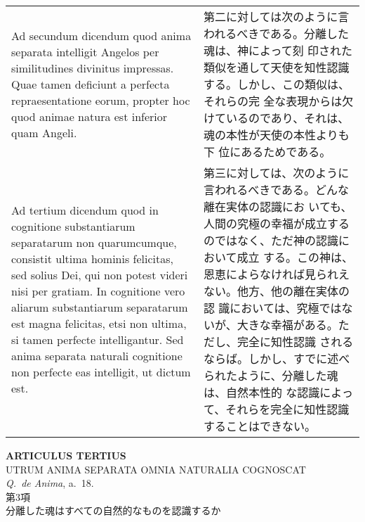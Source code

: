 \documentclass[10pt]{jsarticle} %
\begin{document}
\begin{longtable}{p{21em}p{21em}}
\\


{\sc Ad secundum dicendum} quod anima separata intelligit Angelos per
similitudines divinitus impressas. Quae tamen deficiunt a perfecta
repraesentatione eorum, propter hoc quod animae natura est inferior
quam Angeli.

&

第二に対しては次のように言われるべきである。分離した魂は、神によって刻
印された類似を通して天使を知性認識する。しかし、この類似は、それらの完
全な表現からは欠けているのであり、それは、魂の本性が天使の本性よりも下
位にあるためである。



\\


{\sc Ad tertium dicendum} quod in cognitione substantiarum separatarum
non quarumcumque, consistit ultima hominis felicitas, sed solius Dei,
qui non potest videri nisi per gratiam. In cognitione vero aliarum
substantiarum separatarum est magna felicitas, etsi non ultima, si
tamen perfecte intelligantur. Sed anima separata naturali cognitione
non perfecte eas intelligit, ut dictum est.

&

第三に対しては、次のように言われるべきである。どんな離在実体の認識にお
いても、人間の究極の幸福が成立するのではなく、ただ神の認識において成立
する。この神は、恩恵によらなければ見られえない。他方、他の離在実体の認
識においては、究極ではないが、大きな幸福がある。ただし、完全に知性認識
されるならば。しかし、すでに述べられたように、分離した魂は、自然本性的
な認識によって、それらを完全に知性認識することはできない。



\end{longtable}

\newpage
{}

\begin{center}
{\Large {\bf ARTICULUS TERTIUS}}\\ {\large UTRUM ANIMA SEPARATA OMNIA
NATURALIA COGNOSCAT}\\ {\footnotesize {\it Q.~de Anima}, a.~18.}\\
{\Large 第3項\\分離した魂はすべての自然的なものを認識するか}
\end{center}
\end{document}
